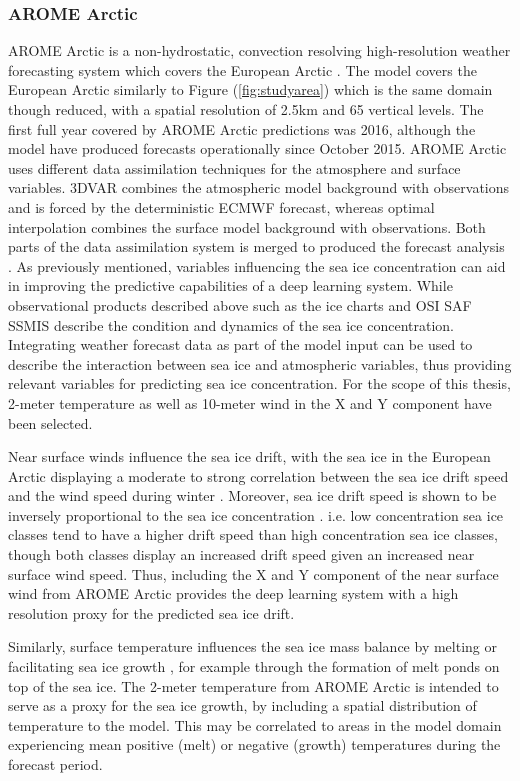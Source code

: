 \documentclass[../main/thesis.tex]{subfiles}
\begin{document}
\subsubsection{AROME Arctic}
AROME Arctic is a non-hydrostatic, convection resolving high-resolution weather forecasting system which covers the European Arctic \citep{Mueller2017}. The model covers the European Arctic similarly to Figure (\ref{fig:studyarea}) which is the same domain though reduced, with a spatial resolution of 2.5km and 65 vertical levels. The first full year covered by AROME Arctic predictions was 2016, although the model have produced forecasts operationally since October 2015. AROME Arctic uses different data assimilation techniques for the atmosphere and surface variables. 3DVAR combines the atmospheric model background with observations and is forced by the deterministic ECMWF forecast, whereas optimal interpolation combines the surface model background with observations. Both parts of the data assimilation system is merged to produced the forecast analysis \citep{Mueller2017}. As previously mentioned, variables influencing the sea ice concentration can aid in improving the predictive capabilities of a deep learning system. While observational products described above such as the ice charts \citep{Dinessen2020} and OSI SAF SSMIS \citep{Tonboe2017} describe the condition and dynamics of the sea ice concentration. Integrating weather forecast data as part of the model input can be used to describe the interaction between sea ice and atmospheric variables, thus providing relevant variables for predicting sea ice concentration. For the scope of this thesis, 2-meter temperature as well as 10-meter wind in the X and Y component have been selected.

Near surface winds influence the sea ice drift, with the sea ice in the European Arctic displaying a moderate to strong correlation between the sea ice drift speed and the wind speed during winter \citep{Spreen2011}. Moreover, sea ice drift speed is shown to be inversely proportional to the sea ice concentration \citep{Yu2020}. i.e. low concentration sea ice classes tend to have a higher drift speed than high concentration sea ice classes, though both classes display an increased drift speed given an increased near surface wind speed. Thus, including the X and Y component of the near surface wind from AROME Arctic provides the deep learning system with a high resolution proxy for the predicted sea ice drift. 

Similarly, surface temperature influences the sea ice mass balance by melting or facilitating sea ice growth \citep{Hibler1979}, for example through the formation of melt ponds on top of the sea ice. The 2-meter temperature from AROME Arctic is intended to serve as a proxy for the sea ice growth, by including a spatial distribution of temperature to the model. This may be correlated to areas in the model domain experiencing mean positive (melt) or negative (growth) temperatures during the forecast period.
\end{document}
